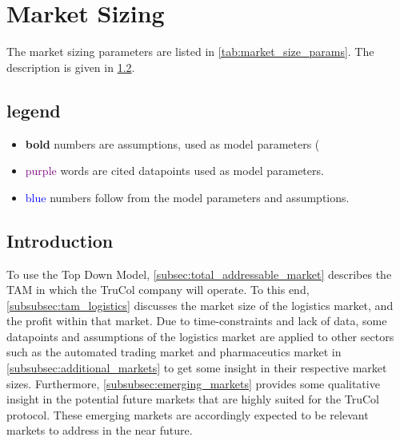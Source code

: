 
\section{Market Sizing}\label{sec:markets}

The market sizing parameters are listed in \cref{tab:market_size_params}. The description is given in \cref{subsec:market_introduction}.
\subsection{legend}
\begin{itemize}
	\item \textbf{bold} numbers are assumptions, used as model parameters (
	\item \textcolor{purple}{purple} words are cited datapoints used as model parameters.
	\item \textcolor{blue}{blue} numbers follow from the model parameters and assumptions.
\end{itemize}

\ifx\homepath\overleafhome
\else
\fi

\subsection{Introduction}\label{subsec:market_introduction}
To use the Top Down Model, \cref{subsec:total_addressable_market} describes the TAM in which the TruCol company will operate. To this end, \cref{subsubsec:tam_logistics} discusses the market size of the logistics market, and the profit within that market. Due to time-constraints and lack of data, some datapoints and assumptions of the logistics market are applied to other sectors such as the automated trading market and pharmaceutics market in \cref{subsubsec:additional_markets} to get some insight in their respective market sizes. Furthermore, \cref{subsubsec:emerging_markets} provides some qualitative insight in the potential future markets that are highly suited for the TruCol protocol. These emerging markets are accordingly expected to be relevant markets to address in the near future.

